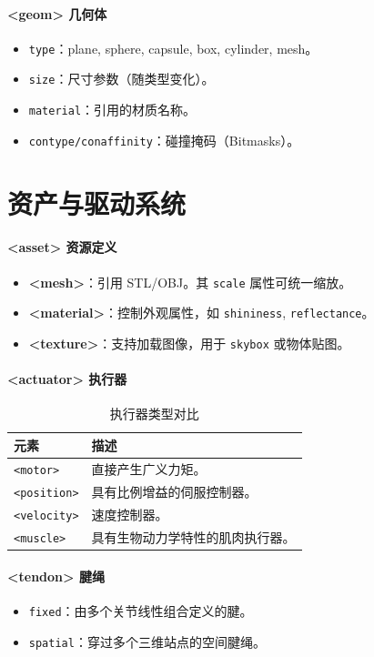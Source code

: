 \documentclass[11pt,a4paper]{book}
\begin{document}
\paragraph{<geom> 几何体}
\begin{itemize}
    \item \texttt{type}：plane, sphere, capsule, box, cylinder, mesh。
    \item \texttt{size}：尺寸参数（随类型变化）。
    \item \texttt{material}：引用的材质名称。
    \item \texttt{contype/conaffinity}：碰撞掩码（Bitmasks）。
\end{itemize}



\section{资产与驱动系统}

\paragraph{<asset> 资源定义}
\begin{itemize}
    \item \textbf{<mesh>}：引用 STL/OBJ。其 \texttt{scale} 属性可统一缩放。
    \item \textbf{<material>}：控制外观属性，如 \texttt{shininess}, \texttt{reflectance}。
    \item \textbf{<texture>}：支持加载图像，用于 \texttt{skybox} 或物体贴图。
\end{itemize}

\paragraph{<actuator> 执行器}
\begin{longtable}{lp{12cm}}
\caption{执行器类型对比} \\
\toprule
\textbf{元素} & \textbf{描述} \\ \midrule
\texttt{<motor>} & 直接产生广义力矩。 \\
\texttt{<position>} & 具有比例增益的伺服控制器。 \\
\texttt{<velocity>} & 速度控制器。 \\
\texttt{<muscle>} & 具有生物动力学特性的肌肉执行器。 \\
\bottomrule
\end{longtable}

\paragraph{<tendon> 腱绳}
\begin{itemize}
    \item \texttt{fixed}：由多个关节线性组合定义的腱。
    \item \texttt{spatial}：穿过多个三维站点的空间腱绳。
\end{itemize}
\end{document}
